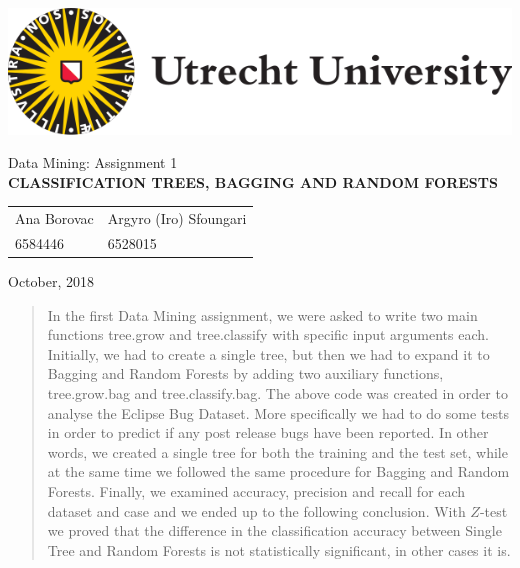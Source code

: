 \documentclass[a4paper,11pt]{article}
\begin{document}
\thispagestyle{empty}

\includegraphics[scale=0.35]{UUlogo.png}

\vspace{50mm}

\begin{center}
\begin{large}
Data Mining: Assignment 1 \\[3mm]
\textbf{
\uppercase{Classification Trees, Bagging and Random Forests}} \\[25mm]
\end{large}

\begin{tabularx}{\textwidth}{YY}
Ana Borovac & Argyro (Iro) Sfoungari \\
6584446 & 6528015
\end{tabularx}
\end{center}

\vfill

October, 2018

\newpage

\tableofcontents

\begin{abstract}
    In the first Data Mining assignment, we were asked to write two main functions tree.grow and tree.classify with specific input arguments each. Initially, we had to create a single tree, but then we had to expand it to Bagging and Random Forests by adding two auxiliary functions, tree.grow.bag and tree.classify.bag. The above code was created in order to analyse the Eclipse Bug Dataset. More specifically we had to do some tests in order to predict if any post release bugs have been reported. In other words, we created a single tree for both the training and the test set, while at the same time we followed the same procedure for Bagging and Random Forests. Finally, we examined accuracy, precision and recall for each dataset and case and we ended up to the following conclusion. With $Z$-test we proved that the difference in the classification accuracy between Single Tree and Random Forests is not statistically significant, in other cases it is.
\end{abstract}
\end{document}

